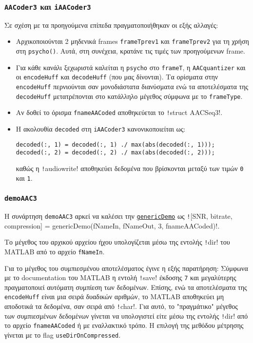 \subsubsection{\texttt{AACoder3} και \texttt{iAACoder3}}
Σε σχέση με τα προηγούμενα επίπεδα πραγματοποιήθηκαν οι εξής αλλαγές:
\begin{itemize}
\item Αρχικοποιούνται 2 μηδενικά frames \texttt{frameTprev1} και \texttt{frameTprev2} για τη χρήση στη \texttt{psycho()}.
Αυτά, στη συνέχεια, κρατάνε τις τιμές των προηγούμενων frame.

\item Για κάθε κανάλι ξεχωριστά καλείται η \texttt{psycho} στο \texttt{frameT}, η \texttt{AACquantizer} και οι \texttt{encodeHuff} και \texttt{decodeHuff} (που μας δίνονται).
Τα ορίσματα στην \texttt{encodeHuff} περνιούνται σαν μονοδιάστατα διανύσματα ενώ τα αποτελέσματα της \texttt{decodeHuff} μετατρέπονται στο κατάλληλο μέγεθος σύμφωνα με το \texttt{frameType}.

\item Αν δοθεί το όρισμα \texttt{fnameAACoded} αποθηκεύεται το \texttt!struct AACSeq3!.

\item Η ακολουθία \texttt{decoded} στη \texttt{iAACoder3} κανονικοποιείται ως:
\begin{verbatim}
decoded(:, 1) = decoded(:, 1) ./ max(abs(decoded(:, 1)));
decoded(:, 2) = decoded(:, 2) ./ max(abs(decoded(:, 2)));
\end{verbatim}
καθώς η \texttt!audiowrite! αποθηκεύει δεδομένα που βρίσκονται μεταξύ των τιμών \texttt{0} και \texttt{1}.
\end{itemize}

\subsubsection{\texttt{demoAAC3}}
Η συνάρτηση \texttt{demoAAC3} αρκεί να καλέσει την \hyperref[genericDemo]{\texttt{genericDemo}}
ως \texttt![SNR, bitrate, compression] = genericDemo(fNameIn, fNameOut, 3, fnameAACoded)!.

Το μέγεθος του αρχικού αρχείου ήχου υπολογίζεται μέσω της εντολής \texttt!dir! του MATLAB από το αρχείο \texttt{fNameIn}.

Για το μέγεθος του συμπιεσμένου αποτελέσματος έγινε η εξής παρατήρηση:
Σύμφωνα με το documentation του MATLAB η εντολή \texttt!save! έκδοσης \texttt{7} και μεγαλύτερης πραγματοποιεί αυτόματη συμπίεση των δεδομένων.
Επίσης, ενώ τα αποτελέσματα της \texttt{encodeHuff} είναι μια σειρά δυαδικών αριθμών, το MATLAB αποθηκεύει μη αποδοτικά τα δεδομένα, σαν σειρά από \texttt!char!.
Για αυτό, το "πραγμάτικο" μέγεθος των συμπιεσμένων δεδομένων γίνεται να υπολογιστεί είτε μέσω της εντολής \texttt!dir! από το αρχείο \texttt{fnameAACoded} ή με εναλλακτικό τρόπο.
Η επιλογή της μεθόδου μέτρησης γίνεται με το flag \texttt{useDirOnCompressed}.

